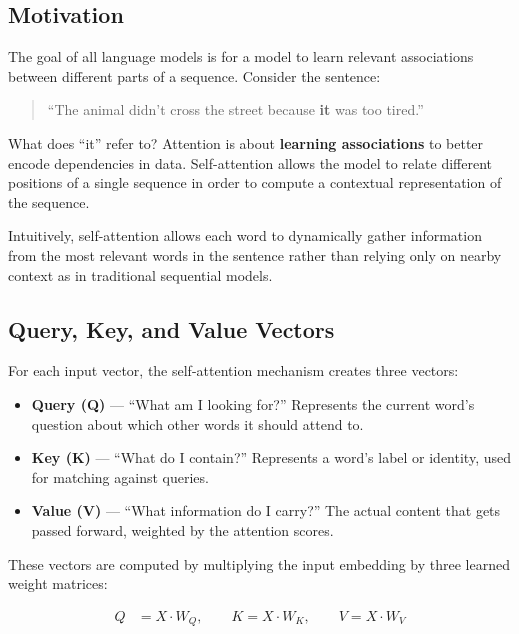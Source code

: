 \documentclass[11pt]{article}
\begin{document}
\subsection{Motivation}

The goal of all language models is for a model to learn relevant associations between different parts of a sequence. Consider the sentence:

\begin{quote}
``The animal didn't cross the street because \textbf{it} was too tired.''
\end{quote}

\noindent What does ``it'' refer to? Attention is about \textbf{learning associations} to better encode dependencies in data. Self-attention allows the model to relate different positions of a single sequence in order to compute a contextual representation of the sequence.

Intuitively, self-attention allows each word to dynamically gather information from the most relevant words in the sentence rather than relying only on nearby context as in traditional sequential models.

\subsection{Query, Key, and Value Vectors}
\label{sec:qkv}

For each input vector, the self-attention mechanism creates three vectors:

\begin{itemize}[nosep]
  \item \textbf{Query (Q)} --- ``What am I looking for?'' Represents the current word's question about which other words it should attend to.
  \item \textbf{Key (K)} --- ``What do I contain?'' Represents a word's label or identity, used for matching against queries.
  \item \textbf{Value (V)} --- ``What information do I carry?'' The actual content that gets passed forward, weighted by the attention scores.
\end{itemize}

These vectors are computed by multiplying the input embedding by three learned weight matrices:

\begin{align}
  Q &= X \cdot W_Q, \qquad 
  K = X \cdot W_K, \qquad 
  V = X \cdot W_V
\end{align}
\end{document}
